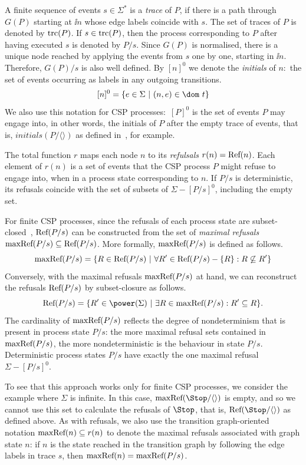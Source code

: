 A finite sequence of events $s\in\Sigma^*$ is a \emph{trace} of $P$, if there
is a path through $G(P)$ starting  at $\ii n$ whose edge labels coincide with
$s$. The set of traces of $P$ is denoted by $\text{trc}(P)$. If $s\in\text{trc}(P)$, then
the process corresponding to $P$ after having executed $s$ is denoted by
$P/s$. Since $G(P)$ is normalised, there is a unique node reached by applying
the events from $s$ one by one, starting in $\ii n$. Therefore, $G(P)/s$  is
also well defined. By $[n]^0$ we denote the \emph{initials} of $n$:~the set
of events occurring as labels in any outgoing transitions.
$$
[n]^0 = \{ e\in\Sigma~|~(n,e)\in\dom~t \}
$$
We also use this notation for CSP processes:~$[P]^0$ is the set of events $P$
may engage into, in other words, the initials of $P$ after the empty trace of
events, that is, $initials(P/\langle\rangle)$ as defined
in~\cite{Roscoe2010}, for example.

The total function $r$ maps each node $n$ to its \emph{refulsals} $r(n) =
\text{Ref}(n)$. Each element of $r(n)$ is a set of events that the CSP process $P$
might refuse to engage into, when in a process state corresponding to $n$.
 If $P/s$ is deterministic, its refusals coincide with the set of
subsets of $\Sigma - [P/s]^0$, including the empty set.

For finite CSP processes, since the refusals of each process state are
subset-closed~\cite{Hoare:1985:CSP:3921,Roscoe2010}, $\text{Ref}(P/s)$ can be
constructed from the set of \emph{maximal refusals}
$\text{maxRef}(P/s)\subseteq\text{Ref}(P/s)$. More formally, $\text{maxRef}(P/s)$ is defined
as follows.
%
\begin{equation}
\text{maxRef}(P/s) = \{ R \in\text{Ref}(P/s)~|~\forall R'\in \text{Ref}(P/s) - \{ R\}: R \not\subseteq R'\}
\end{equation}
%
Conversely, with the maximal refusals $\text{maxRef}(P/s)$ at hand, we can
reconstruct the refusals $\text{Ref}(P/s)$ by subset-closure as follows.
%
\begin{equation}
\refs(P/s) = \{ R'\in\power(\Sigma)~|~\exists R\in \maxrefs(P/s): R'\subseteq R \}.
\end{equation}
%
The cardinality of $\text{maxRef}(P/s)$ reflects the degree of
nondeterminism that is present in process state $P/s$: the more maximal refusal sets
contained in  $\text{maxRef}(P/s)$, the more nondeterministic is the behaviour in
state $P/s$. Deterministic process states $P/s$ have exactly the one maximal refusal
$\Sigma-[P/s]^0$.

To see that this approach works only for finite CSP processes, we consider
the example where $\Sigma$ is infinite. In this case,
$\maxrefs(\Stop/\langle\rangle)$ is empty, and so we cannot use this set to
calculate the refusals of $\Stop$, that is, $\refs(\Stop/\langle\rangle)$ as
defined above. As with refusals, we also use the transition graph-oriented
notation $\text{maxRef}(n) \subseteq r(n)$ to denote the maximal refusals
associated with graph state $n$: if $n$ is the state reached in the
transition graph by following the edge labels in trace $s$, then $\text{maxRef}(n)
= \text{maxRef}(P/s)$.


